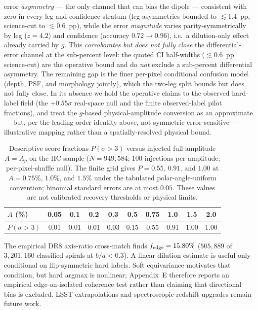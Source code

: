 \documentclass[aps,prd,twocolumn,superscriptaddress,preprintnumbers,nofootinbib,longbibliography,floatfix]{revtex4-2}
\newcommand{\sigmaunit}{\sigma}
\begin{document}
error \emph{asymmetry} --- the only channel that can bias the dipole ---
consistent with zero in every leg and confidence stratum (leg asymmetries
bounded to $\lesssim\!1.4$~pp, science-cut to $\lesssim\!0.6$~pp), while
the error \emph{magnitude} varies parity-symmetrically by leg ($z\!=\!4.2$)
and confidence (accuracy $0.72\!\to\!0.96$), i.e.\ a dilution-only effect
already carried by $g$. This \emph{corroborates but does not fully close}
the differential-error channel at the sub-percent level: the quoted CI
half-widths ($\lesssim\!0.6$~pp science-cut) are the operative bound and
do \emph{not} exclude a sub-percent differential asymmetry. The remaining
gap is the finer per-pixel
conditional confusion model (depth, PSF, and morphology jointly), which
the two-leg split bounds but does not fully close. In its
absence we hold the operative claims to the observed hard-label field
(the $+0.55\sigmaunit$ real-space null and the finite observed-label pilot
fractions), and treat the $g$-based physical-amplitude conversion as an
approximate --- but, per the leading-order identity above, not
symmetric-error-sensitive --- illustrative mapping rather than a
spatially-resolved physical bound.

\begin{table}[H]
\caption{Descriptive score fractions $P(\sigma>3)$ versus injected full amplitude $A=A_p$ on the HC sample ($N=949{,}584$; 100 injections per amplitude; per-pixel-shuffle null). The finite grid gives $P=0.55$, $0.91$, and $1.00$ at $A=0.75\%$, $1.0\%$, and $1.5\%$ under the tabulated polar-angle-uniform convention; binomial standard errors are at most $0.05$. These values are not calibrated recovery thresholds or physical limits.\label{tab:injection_recovery}}
\begin{ruledtabular}
\begin{tabular}{lccccccccc}
$A$ (\%) & 0.05 & 0.1 & 0.2 & 0.3 & 0.5 & 0.75 & 1.0 & 1.5 & 2.0 \\
\hline
$P(\sigma\!>\!3)$ & 0.01 & 0.01 & 0.01 & 0.03 & 0.15 & 0.55 & 0.91 & 1.00 & 1.00 \\
\end{tabular}
\end{ruledtabular}
\end{table}

The empirical DR8 axis-ratio cross-match finds $f_{\rm edge}=15.80\%$ ($505{,}889$ of $3{,}201{,}160$ classified spirals at $b/a<0.3$). A linear dilution estimate is useful only conditional on flip-symmetric hard labels. Soft equivariance motivates that condition, but hard argmax is nonlinear; Appendix~E therefore reports an empirical edge-on-isolated coherence test rather than claiming that directional bias is excluded. LSST extrapolations and spectroscopic-redshift upgrades remain future work.
\end{document}
